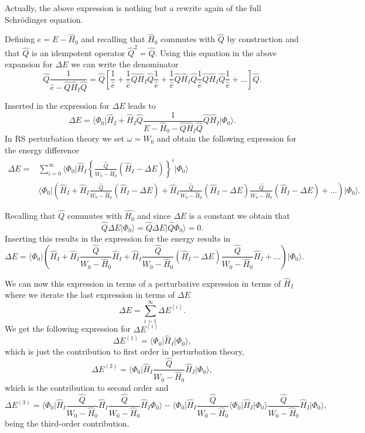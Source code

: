 Actually, the above expression is nothing but a rewrite again of the full Schr\"odinger equation. 

Defining $e=E-\hat{H}_0$ and recalling that $\hat{H}_0$ commutes with 
$\hat{Q}$ by construction and that $\hat{Q}$ is an idempotent operator
$\hat{Q}^2=\hat{Q}$. 
Using this equation in the above expansion for $\Delta E$ we can write the denominator 
\[
\hat{Q}\frac{1}{\hat{e}-\hat{Q}\hat{H}_I\hat{Q}}=\hat{Q}\left[\frac{1}{\hat{e}}+\frac{1}{\hat{e}}\hat{Q}\hat{H}_I\hat{Q}
\frac{1}{\hat{e}}+\frac{1}{\hat{e}}\hat{Q}\hat{H}_I\hat{Q}
\frac{1}{\hat{e}}\hat{Q}\hat{H}_I\hat{Q}\frac{1}{\hat{e}}+\dots\right]\hat{Q}.
\]

Inserted in the expression for $\Delta E$ leads to 
\[
\Delta E=
\langle \Phi_0\vert \hat{H}_I+\hat{H}_I\hat{Q}\frac{1}{E-\hat{H}_0-\hat{Q}\hat{H}_I\hat{Q}}\hat{Q}\hat{H}_I\vert \Phi_0\rangle. 
\]
In RS perturbation theory we set $\omega = W_0$ and obtain the following expression for the energy difference
\begin{align}
\Delta E =& \sum_{i=0}^{\infty}\langle \Phi_0\vert \hat{H}_I\left\{\frac{\hat{Q}}{W_0-\hat{H}_0}\left(\hat{H}_I-\Delta E\right)\right\}^i\vert \Phi_0\rangle\\
& \langle \Phi_0\vert \left(\hat{H}_I+\hat{H}_I\frac{\hat{Q}}{W_0-\hat{H}_0}(\hat{H}_I-\Delta E)+
\hat{H}_I\frac{\hat{Q}}{W_0-\hat{H}_0}(\hat{H}_I-\Delta E)\frac{\hat{Q}}{W_0-\hat{H}_0}(\hat{H}_I-\Delta E)+\dots\right)\vert \Phi_0\rangle.
\end{align}



Recalling that $\hat{Q}$ commutes with $\hat{H_0}$ and since $\Delta E$ is a constant we obtain that
\[
\hat{Q}\Delta E\vert \Phi_0\rangle = \hat{Q}\Delta E\vert \hat{Q}\Phi_0\rangle = 0.
\]
Inserting this results in the expression for the energy results in
\[
\Delta E=\langle \Phi_0\vert \left(\hat{H}_I+\hat{H}_I\frac{\hat{Q}}{W_0-\hat{H}_0}\hat{H}_I+
\hat{H}_I\frac{\hat{Q}}{W_0-\hat{H}_0}(\hat{H}_I-\Delta E)\frac{\hat{Q}}{W_0-\hat{H}_0}\hat{H}_I+\dots\right)\vert \Phi_0\rangle.
\]



We can now this expression in terms of a perturbative expression in terms
of $\hat{H}_I$ where we iterate the last expression in terms of $\Delta E$
\[
\Delta E=\sum_{i=1}^{\infty}\Delta E^{(i)}.
\]
We get the following expression for $\Delta E^{(i)}$
\[
\Delta E^{(1)}=\langle \Phi_0\vert \hat{H}_I\vert \Phi_0\rangle,
\] 
which is just the contribution to first order in perturbation theory,
\[
\Delta E^{(2)}=\langle\Phi_0\vert \hat{H}_I\frac{\hat{Q}}{W_0-\hat{H}_0}\hat{H}_I\vert \Phi_0\rangle, 
\]
which is the contribution to second order and
\[
\Delta E^{(3)}=\langle \Phi_0\vert \hat{H}_I\frac{\hat{Q}}{W_0-\hat{H}_0}\hat{H}_I\frac{\hat{Q}}{W_0-\hat{H}_0}\hat{H}_I\Phi_0\rangle-
\langle\Phi_0\vert \hat{H}_I\frac{\hat{Q}}{W_0-\hat{H}_0}\langle \Phi_0\vert \hat{H}_I\vert \Phi_0\rangle\frac{\hat{Q}}{W_0-\hat{H}_0}\hat{H}_I\vert \Phi_0\rangle,
\]
being the third-order contribution. 


